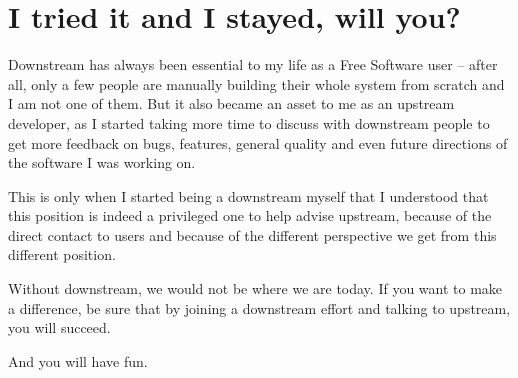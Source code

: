 \section*{I tried it and I stayed, will you?}

Downstream has always been essential to my life as a Free Software user --
after all, only a few people are manually building their whole system from
scratch and I am not one of them. But it also became an asset to me as an
upstream developer, as I started taking more time to discuss with downstream
people to get more feedback on bugs, features, general quality and even future
directions of the software I was working on.

This is only when I started being a downstream myself that I understood that
this position is indeed a privileged one to help advise upstream, because of
the direct contact to users and because of the different perspective we get
from this different position.

Without downstream, we would not be where we are today. If you want to make a
difference, be sure that by joining a downstream effort and talking to
upstream, you will succeed.

And you will have fun.
